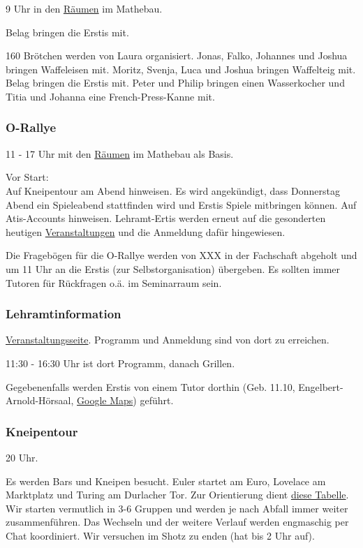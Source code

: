 \documentclass[10pt,ngerman]{scrartcl}
\begin{document}
\begin{multicols}{2}
9 Uhr in den \hyperref[rooms]{Räumen} im Mathebau.

Belag bringen die Erstis mit.

160 Brötchen werden von Laura organisiert. Jonas, Falko, Johannes
und Joshua bringen Waffeleisen mit. Moritz, Svenja, Luca und Joshua
bringen Waffelteig mit. Belag bringen die Erstis mit. Peter und Philip
bringen einen Wasserkocher und Titia und Johanna eine French-Press-Kanne
mit.

\subsubsection{O-Rallye}

11 - 17 Uhr mit den \hyperref[rooms]{Räumen} im Mathebau als Basis.

Vor Start: \\
Auf Kneipentour am Abend hinweisen.
Es wird angekündigt, dass Donnerstag Abend ein Spieleabend stattfinden wird und Erstis Spiele mitbringen können.
Auf Atis-Accounts hinweisen.
Lehramt-Ertis werden erneut auf die gesonderten heutigen \hyperref[lehramt]{Veranstaltungen} und die Anmeldung dafür hingewiesen.

Die Fragebögen für die O-Rallye werden von XXX in der Fachschaft
abgeholt und um 11 Uhr an die Erstis (zur Selbstorganisation) übergeben.
Es sollten immer Tutoren für Rückfragen o.ä. im Seminarraum sein.

\subsubsection{Lehramtinformation}\label{lehramt}

\href{https://www.hoc.kit.edu/zlb/Veranstaltungskalender.php/event/46988?}{Veranstaltungsseite}.
Programm und Anmeldung sind von dort zu erreichen.

11:30 - 16:30 Uhr ist dort Programm, danach Grillen.

Gegebenenfalls werden Erstis von einem Tutor dorthin (Geb. 11.10, Engelbert-Arnold-Hörsaal, \href{https://goo.gl/maps/R9WbmtbrKRxdziYY9}{Google Maps}) geführt.


\subsubsection{Kneipentour}

20 Uhr.

Es werden Bars und Kneipen besucht.
Euler startet am Euro, Lovelace am Marktplatz und Turing am Durlacher Tor.
Zur Orientierung dient \href{https://docs.google.com/spreadsheets/d/1Ea5M858ijKzbtYuySIMmbNUEUUtv-4jGpAmmq59vIvc/edit?usp=sharing}{diese Tabelle}.
Wir starten vermutlich in 3-6 Gruppen und werden je nach Abfall immer weiter zusammenführen.
Das Wechseln und der weitere Verlauf werden engmaschig per Chat koordiniert.
Wir versuchen im Shotz zu enden (hat bis 2 Uhr auf).


\end{multicols}
\end{document}

